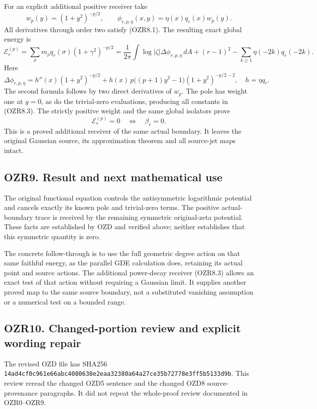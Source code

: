 For an explicit additional positive receiver take \[
w_p(y)=(1+y^2)^{-p/2},\qquad
\phi_{r,p,\eta}(x,y)=\eta(x)q_r(x)w_p(y).
\] All derivatives through order two satisfy (OZR8.1). The resulting
exact global energy is \[
\mathcal E^{(p)}_r=\sum_\rho m_\rho q_r(\sigma)(1+\gamma^2)^{-p/2}
=\frac1{2\pi}\int\log|\zeta|\Delta\phi_{r,p,\eta}\,dA
+(r-1)^2-\sum_{k\ge1}\eta(-2k)q_r(-2k).
\tag{OZR8.3}
\] Here \[
\Delta\phi_{r,p,\eta}=h''(x)(1+y^2)^{-p/2}
+h(x)\,p\bigl((p+1)y^2-1\bigr)(1+y^2)^{-p/2-2},
\quad h=\eta q_r.
\tag{OZR8.4}
\] The second formula follows by two direct derivatives of \(w_p\). The
pole has weight one at \(y=0\), as do the trivial-zero evaluations,
producing all constants in (OZR8.3). The strictly positive weight and
the same global isolators prove \[
\mathcal E^{(p)}_r=0\quad\Longleftrightarrow\quad\beta_r=0.
\tag{OZR8.5}
\] This is a proved additional receiver of the same actual boundary. It
leaves the original Gaussian source, its approximation theorem and all
source-jet maps intact.

\subsection{OZR9. Result and next mathematical
use}\label{ozr9.-result-and-next-mathematical-use}

The original functional equation controls the antisymmetric logarithmic
potential and cancels exactly its known pole and trivial-zero terms. The
positive actual-boundary trace is received by the remaining symmetric
original-zeta potential. These facts are established by OZD and verified
above; neither establishes that this symmetric quantity is zero.

The concrete follow-through is to use the full geometric degree action
on that same faithful energy, as the parallel GDE calculation does,
retaining its actual point and source actions. The additional
power-decay receiver (OZR8.3) allows an exact test of that action
without requiring a Gaussian limit. It supplies another proved map to
the same source boundary, not a substituted vanishing assumption or a
numerical test on a bounded range.

\subsection{OZR10. Changed-portion review and explicit wording
repair}\label{ozr10.-changed-portion-review-and-explicit-wording-repair}

The revised OZD file has SHA256
\nolinkurl{14ad4cf0c961e66abc4080638e2eaa32380a64a27ce35b72778e3ff5b5133d9b}.
This review reread the changed OZD5 sentence and the changed OZD8
source-provenance paragraphs. It did not repeat the whole-proof review
documented in OZR0--OZR9.

